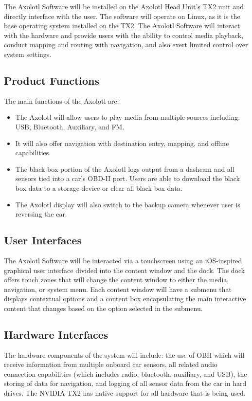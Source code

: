 \documentclass[onecolumn, draftclsnofoot,10pt, compsoc]{IEEEtran}
\begin{document}
The Axolotl Software will be installed on the Axolotl Head Unit's TX2 unit and directly interface with the user. The software will operate on Linux, as it is the base operating system installed on the TX2. The Axolotl Software will interact with the hardware and provide users with the ability to control media playback, conduct mapping and routing with navigation, and also exert limited control over system settings.\par

\subsection{Product Functions}
The main functions of the Axolotl are:
\begin{itemize}
	\item	The Axolotl will allow users to play media from multiple sources including: USB, Bluetooth, Auxiliary, and FM.
	\item	It will also offer navigation with destination entry, mapping, and offline capabilities. 
	\item	The black box portion of the Axolotl logs output from a dashcam and all sensors tied into a car's OBD-II port. Users are able to download the black box data to a storage device or clear all black box data. 
	\item	The Axolotl display will also switch to the backup camera whenever user is reversing the car.
	
\end{itemize}
\subsection{User Interfaces}
The Axolotl Software will be interacted via a touchscreen using an iOS-inspired graphical user interface divided into the content window and the dock. The dock offers touch zones that will change the content window to either the media, navigation, or system menu. Each content window will have a submenu that displays contextual options and a content box encapsulating the main interactive content that changes based on the option selected in the submenu.\par
\subsection{Hardware Interfaces}
The hardware components of the system will include: the use of OBII which will receive information from multiple onboard car sensors, all related audio connection capabilities (which includes radio, bluetooth, auxiliary, and USB), the storing of data for navigation, and logging of all sensor data from the car in hard drives. The NVIDIA TX2 has native support for all hardware that is being used. \par
\end{document}
